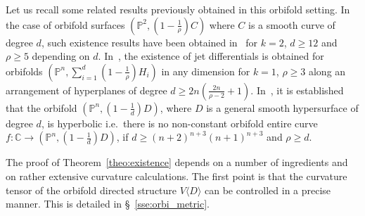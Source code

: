 \documentclass[AHL,Unicode,longabstracts,published]{cedram}
\newcommand*\bC{\mathbb{C}}
\newcommand*\bP{\mathbb{P}}
\let\geq\geqslant
\begin{document}
Let us recall some related results previously obtained in this orbifold setting. In the case of orbifold surfaces $(\bP^2,(1-\tfrac{1}{\rho})C)$ where $C$ is a smooth curve of degree $d$, such existence results have been obtained in~\cite{CDR20} for $k=2$, $d\geq 12$ and $\rho \geq 5$ depending on $d$. In~\cite{DR20}, the existence of jet differentials is obtained for orbifolds $(\bP^n,\sum_{i=1}^d(1-\tfrac{1}{\rho})H_i)$ in any dimension for $k=1$, $\rho \geq 3$ along an arrangement of hyperplanes of degree $d\geq 2n(\tfrac{2n }{ \rho-2} + 1)$. In~\cite{BD18}, it is established that the orbifold $(\bP^n,(1-\tfrac{1}{ d})D)$, where $D$ is a general smooth hypersurface of degree $d$, is hyperbolic i.e.\ there is no non-constant orbifold entire curve $f\colon\bC\to(\bP^n, (1-\tfrac{1}{d})D)$, if $d\geq (n+2)^{n+3}(n+1)^{n+3}$ and $\rho\geq d$.

The proof of Theorem~\ref{theo:existence} depends on a number of ingredients and on rather extensive curvature calculations. The first point is that the curvature tensor of the orbifold directed structure
$V\langle D\rangle$ can be controlled in a precise manner. This is detailed in \S~\ref{sse:orbi_metric}.
\end{document}
